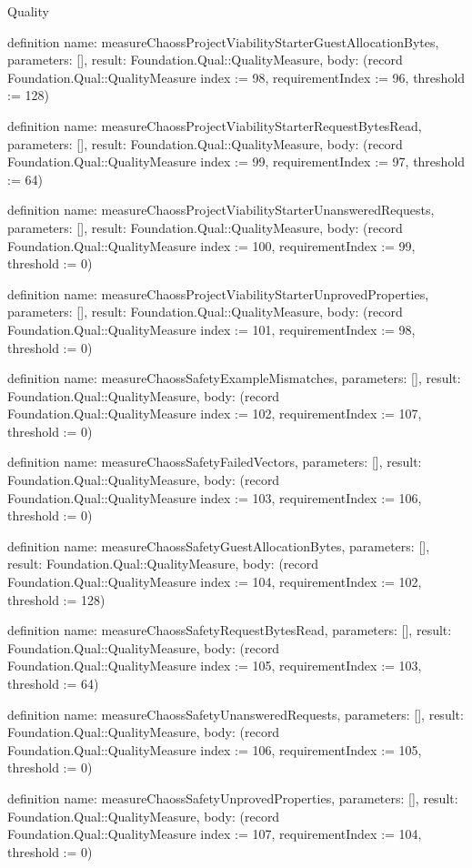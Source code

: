 \begin{lexlean}{Quality}
\begin{semanticmodule}
definition{
  name: measureChaossProjectViabilityStarterGuestAllocationBytes,
  parameters: [],
  result: Foundation.Qual::QualityMeasure,
  body: (record Foundation.Qual::QualityMeasure {index := 98, requirementIndex := 96, threshold := 128})
}

definition{
  name: measureChaossProjectViabilityStarterRequestBytesRead,
  parameters: [],
  result: Foundation.Qual::QualityMeasure,
  body: (record Foundation.Qual::QualityMeasure {index := 99, requirementIndex := 97, threshold := 64})
}

definition{
  name: measureChaossProjectViabilityStarterUnansweredRequests,
  parameters: [],
  result: Foundation.Qual::QualityMeasure,
  body: (record Foundation.Qual::QualityMeasure {index := 100, requirementIndex := 99, threshold := 0})
}

definition{
  name: measureChaossProjectViabilityStarterUnprovedProperties,
  parameters: [],
  result: Foundation.Qual::QualityMeasure,
  body: (record Foundation.Qual::QualityMeasure {index := 101, requirementIndex := 98, threshold := 0})
}

definition{
  name: measureChaossSafetyExampleMismatches,
  parameters: [],
  result: Foundation.Qual::QualityMeasure,
  body: (record Foundation.Qual::QualityMeasure {index := 102, requirementIndex := 107, threshold := 0})
}

definition{
  name: measureChaossSafetyFailedVectors,
  parameters: [],
  result: Foundation.Qual::QualityMeasure,
  body: (record Foundation.Qual::QualityMeasure {index := 103, requirementIndex := 106, threshold := 0})
}

definition{
  name: measureChaossSafetyGuestAllocationBytes,
  parameters: [],
  result: Foundation.Qual::QualityMeasure,
  body: (record Foundation.Qual::QualityMeasure {index := 104, requirementIndex := 102, threshold := 128})
}

definition{
  name: measureChaossSafetyRequestBytesRead,
  parameters: [],
  result: Foundation.Qual::QualityMeasure,
  body: (record Foundation.Qual::QualityMeasure {index := 105, requirementIndex := 103, threshold := 64})
}

definition{
  name: measureChaossSafetyUnansweredRequests,
  parameters: [],
  result: Foundation.Qual::QualityMeasure,
  body: (record Foundation.Qual::QualityMeasure {index := 106, requirementIndex := 105, threshold := 0})
}

definition{
  name: measureChaossSafetyUnprovedProperties,
  parameters: [],
  result: Foundation.Qual::QualityMeasure,
  body: (record Foundation.Qual::QualityMeasure {index := 107, requirementIndex := 104, threshold := 0})
}


\end{semanticmodule}
\end{lexlean}
